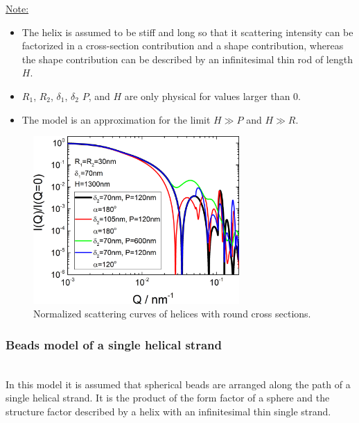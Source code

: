 \noindent\underline{Note:}
\begin{itemize}
\item The helix is assumed to be stiff and long so that it scattering intensity can be factorized in a cross-section contribution and a shape contribution, whereas the shape contribution can be described by an infinitesimal thin rod of length $H$.
\item $R_1$, $R_2$, $\delta_1$, $\delta_2$ $P$, and $H$ are only physical for values larger than 0.
\item The model is an approximation for the limit $H \gg P$ and $H \gg R$.
\end{itemize}

\begin{figure}[htb]
\begin{center}
\includegraphics[width=0.7\textwidth]{../images/form_factor/cylindrical_obj/helix_round_IQ.png}
\end{center}
\caption{Normalized scattering curves of helices with round cross sections.}
\label{fig:helixroundIQ}
\end{figure}

\newpage
\subsubsection{Beads model of a single helical strand} ~\\
In this model  \cite{Lebedev2003,Avdeev2013} it is assumed that spherical beads are arranged along the path of a single helical strand. It is the product of the form factor of a sphere and the structure factor described by a helix with an infinitesimal thin single strand.

